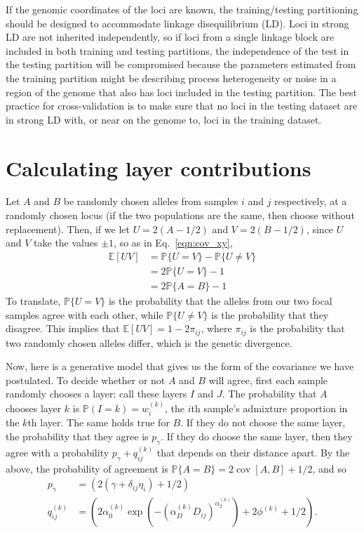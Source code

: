 \documentclass[10pt,letterpaper]{article}
\renewcommand{\P}{\mathbb{P}}
\newcommand{\E}{\mathbb{E}}
\newcommand{\cov}{\mathop{\mbox{cov}}}
\begin{document}
If the genomic coordinates of the loci are known, 
the training/testing partitioning should be designed to accommodate linkage disequilibrium (LD).
Loci in strong LD are not inherited independently,
so if loci from a single linkage block are included in both training and testing partitions, 
the independence of the test in the testing partition will be compromised 
because the parameters estimated from the training partition 
might be describing process heterogeneity or noise 
in a region of the genome that also has loci included in the testing partition.
The best practice for cross-validation is to make sure that 
no loci in the testing dataset are in strong LD with, 
or near on the genome to, loci in the training dataset.


\section*{Calculating layer contributions}\label{layer_contribution}

Let $A$ and $B$ be randomly chosen alleles from samples $i$ and $j$ respectively,
at a randomly chosen locus 
(if the two populations are the same, then choose without replacement).
Then, if we let $U=2(A-1/2)$ and $V=2(B-1/2)$,
since $U$ and $V$ take the values $\pm 1$,
so as in Eq.\ \eqref{eqn:cov_xy},
$$\begin{aligned}
\E[UV]
        &= \P\{ U=V \} - \P\{ U \neq V \} \\
        &= 2 \P\{ U=V \} - 1 \\
        &= 2 \P\{ A=B \} - 1 
\end{aligned}$$
To translate, $\P\{ U=V \}$ is the probability that the alleles from our two focal samples agree with each other,
while $\P\{ U \neq V \}$ is the probability that they disagree.
This implies that $\E[UV] = 1 - 2 \pi_{ij}$, 
where $\pi_{ij}$ is the probability that two randomly chosen alleles differ, 
which is the genetic divergence.

Now, here is a generative model that gives us the form of the covariance we have postulated.
To decide whether or not $A$ and $B$ will agree,
first each sample randomly chooses a layer: call these layers $I$ and $J$.
The probability that $A$ chooses layer $k$ is $\P({I=k})=w_i^{(k)}$, 
the $i$th sample's admixture proportion in the $k$th layer.
The same holds true for $B$.
If they do not choose the same layer, the probability that they agree is $p_\gamma$.
If they do choose the same layer, 
then they agree with a probability $p_\gamma + q^{(k)}_{ij}$ that depends on their distance apart.
By the above,
the probability of agreement is $\P\{A=B\} = 2 \cov[A,B] + 1/2$,
and so
$$\begin{aligned}
    p_\gamma &= (2 (\gamma + \delta_{ij} \eta_i) + 1/2) \\
    q^{(k)}_{ij} &= \left(2 \alpha_0^{(k)} \exp\left( - \left(\alpha_D^{(k)} D_{ij}\right)^{\alpha_2^{(k)}} \right) + 2 \phi^{(k)}  + 1/2 \right) .
\end{aligned}$$
\end{document}
